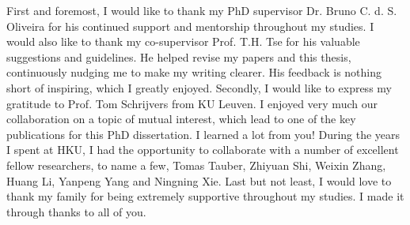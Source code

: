
First and foremost, I would like to thank my PhD supervisor Dr. Bruno C. d. S.
Oliveira for his continued support and mentorship throughout my studies. I would
also like to thank my co-supervisor Prof. T.H. Tse for his valuable suggestions
and guidelines. He helped revise my papers and this thesis, continuously nudging
me to make my writing clearer. His feedback is nothing short of inspiring,
which I greatly enjoyed. Secondly, I would like to express my gratitude to Prof.
Tom Schrijvers from KU Leuven. I enjoyed very much our collaboration on a topic
of mutual interest, which lead to one of the key publications for this PhD
dissertation. I learned a lot from you! During the years I spent at HKU, I had
the opportunity to collaborate with a number of excellent fellow researchers, to
name a few, Tomas Tauber, Zhiyuan Shi, Weixin Zhang, Huang Li, Yanpeng Yang and
Ningning Xie. Last but not least, I would love to thank my family for being
extremely supportive throughout my studies. I made it through thanks to all of
you.
